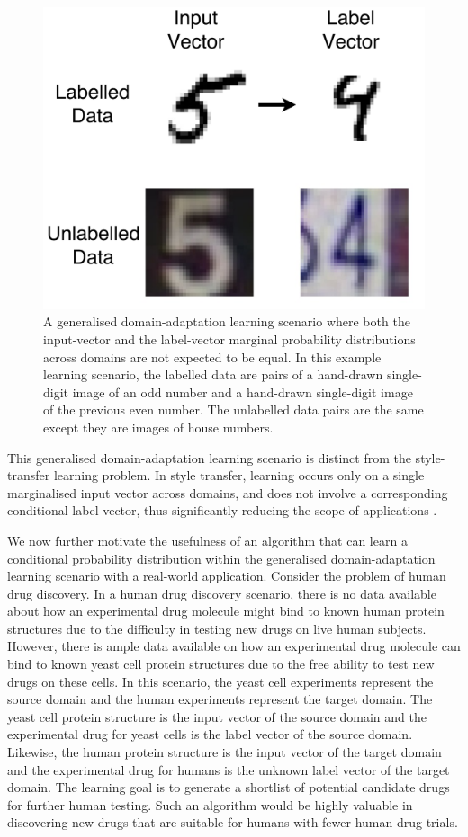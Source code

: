 \documentclass{article}
\begin{document}
\begin{figure}[ht]
\vskip 0.2in
\begin{center}
\centerline{\includegraphics[width=0.6\columnwidth]{example2}}
\caption{A generalised domain-adaptation learning scenario where both the input-vector and the label-vector marginal probability distributions across domains are not expected to be equal. In this example learning scenario, the labelled data are pairs of a hand-drawn single-digit image of an odd number and a hand-drawn single-digit image of the previous even number. The unlabelled data pairs are the same except they are images of house numbers.}
\label{icml-historical}
\end{center}
\vskip -0.2in
\end{figure}

This generalised domain-adaptation learning scenario is distinct from the style-transfer learning problem. In style transfer, learning occurs only on a single marginalised input vector across domains, and does not involve a corresponding conditional label vector, thus significantly reducing the scope of applications \cite{jing2017neural}.

We now further motivate the usefulness of an algorithm that can learn a conditional probability distribution within the generalised domain-adaptation learning scenario with a real-world application. Consider the problem of human drug discovery. In a human drug discovery scenario, there is no data available about how an experimental drug molecule might bind to known human protein structures due to the difficulty in testing new drugs on live human subjects. However, there is ample data available on how an experimental drug molecule can bind to known yeast cell protein structures due to the free ability to test new drugs on these cells. In this scenario, the yeast cell experiments represent the source domain and the human experiments represent the target domain. The yeast cell protein structure is the input vector of the source domain and the experimental drug for yeast cells is the label vector of the source domain. Likewise, the human protein structure is the input vector of the target domain and the experimental drug for humans is the unknown label vector of the target domain. The learning goal is to generate a shortlist of potential candidate drugs for further human testing. Such an algorithm would be highly valuable in discovering new drugs that are suitable for humans with fewer human drug trials.
\end{document}
